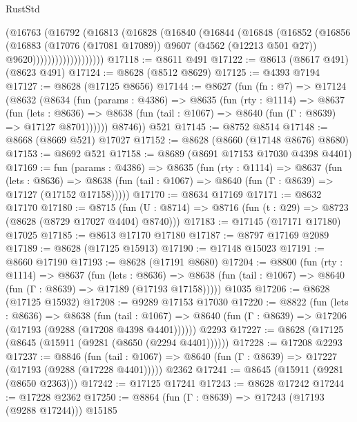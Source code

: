 \begin{lexlean}{RustStd}
\begin{coremodule}
                      (@16763
                        (@16792
                          (@16813
                            (@16828
                              (@16840
                                (@16844
                                  (@16848
                                    (@16852
                                      (@16856
                                        (@16883
                                          (@17076 (@17081 @17089))
                                          @9607
                                          (@4562 (@12213 @501 @27))
                                          @9620)))))))))))))))))))
@17118 := @8611 @491
@17122 := @8613 (@8617 @491) (@8623 @491)
@17124 := @8628 (@8512 @8629)
@17125 := @4393 @7194
@17127 := @8628 (@17125 @8656)
@17144 := @8627
    (fun (fn : @7) =>
    @17124
      (@8632
        (@8634
          (fun (params : @4386) =>
          @8635
            (fun (rty : @1114) =>
            @8637
              (fun (lets : @8636) =>
              @8638 (fun (tail : @1067) => @8640 (fun (Γ : @8639) => @17127 @8701))))))
        @8746))
    @521
@17145 := @8752 @8514
@17148 := @8668 (@8669 @521) @17027
@17152 := @8628 (@8660 (@17148 @8676) @8680)
@17153 := @8692 @521
@17158 := @8689 (@8691 @17153 @17030 @4398 @4401)
@17169 := fun (params : @4386) =>
  @8635
    (fun (rty : @1114) =>
    @8637
      (fun (lets : @8636) =>
      @8638 (fun (tail : @1067) => @8640 (fun (Γ : @8639) => @17127 (@17152 @17158)))))
@17170 := @8634 @17169
@17171 := @8632 @17170
@17180 := @8715
    (fun (U : @8714) => @8716 (fun (t : @29) => @8723 (@8628 (@8729 @17027 @4404) @8740)))
@17183 := @17145 (@17171 @17180) @17025
@17185 := @8613 @17170 @17180
@17187 := @8797 @17169 @2089
@17189 := @8628 (@17125 @15913)
@17190 := @17148 @15023
@17191 := @8660 @17190
@17193 := @8628 (@17191 @8680)
@17204 := @8800
    (fun (rty : @1114) =>
    @8637
      (fun (lets : @8636) =>
      @8638 (fun (tail : @1067) => @8640 (fun (Γ : @8639) => @17189 (@17193 @17158)))))
    @1035
@17206 := @8628 (@17125 @15932)
@17208 := @9289 @17153 @17030
@17220 := @8822
    (fun (lets : @8636) =>
    @8638
      (fun (tail : @1067) =>
      @8640 (fun (Γ : @8639) => @17206 (@17193 (@9288 (@17208 @4398 @4401))))))
    @2293
@17227 := @8628 (@17125 (@8645 (@15911 (@9281 (@8650 (@2294 @4401))))))
@17228 := @17208 @2293
@17237 := @8846
    (fun (tail : @1067) => @8640 (fun (Γ : @8639) => @17227 (@17193 (@9288 (@17228 @4401)))))
    @2362
@17241 := @8645 (@15911 (@9281 (@8650 @2363)))
@17242 := @17125 @17241
@17243 := @8628 @17242
@17244 := @17228 @2362
@17250 := @8864 (fun (Γ : @8639) => @17243 (@17193 (@9288 @17244))) @15185

\end{coremodule}
\end{lexlean}
